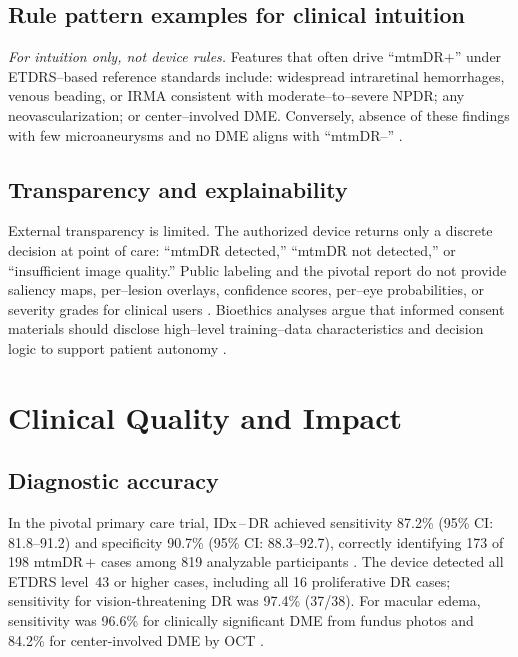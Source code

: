 \documentclass[sigconf]{acmart}
\begin{document}
\subsection{Rule pattern examples for clinical intuition}

\noindent\textit{For intuition only, not device rules.} Features that often drive “mtmDR+” under ETDRS–based reference standards include: widespread intraretinal hemorrhages, venous beading, or IRMA consistent with moderate–to–severe NPDR; any neovascularization; or center–involved DME. Conversely, absence of these findings with few microaneurysms and no DME aligns with “mtmDR–” \citep{ETDRS1991Report12,ADA2025S12}.

\subsection{Transparency and explainability}

External transparency is limited. The authorized device returns only a discrete decision at point of care: “mtmDR detected,” “mtmDR not detected,” or “insufficient image quality.” Public labeling and the pivotal report do not provide saliency maps, per–lesion overlays, confidence scores, per–eye probabilities, or severity grades for clinical users \citep{FDA2018DEN180001,Abramoff2018Pivotal}. Bioethics analyses argue that informed consent materials should disclose high–level training–data characteristics and decision logic to support patient autonomy \citep{Ursin2021InformedConsent}.

\section{Clinical Quality and Impact}

\subsection{Diagnostic accuracy}

In the pivotal primary care trial, IDx\textsuperscript{\textregistered}\,–\,DR achieved sensitivity 87.2\% (95\% CI: 81.8–91.2) and specificity 90.7\% (95\% CI: 88.3–92.7), correctly identifying 173 of 198 mtmDR\,+ cases among 819 analyzable participants \citep{Abramoff2018Pivotal}. The device detected all ETDRS level~43 or higher cases, including all 16 proliferative DR cases; sensitivity for vision‐threatening DR was 97.4\% (37/38). For macular edema, sensitivity was 96.6\% for clinically significant DME from fundus photos and 84.2\% for center‐involved DME by OCT \citep{Abramoff2018Pivotal,FDA2018DEN180001}.
\end{document}
